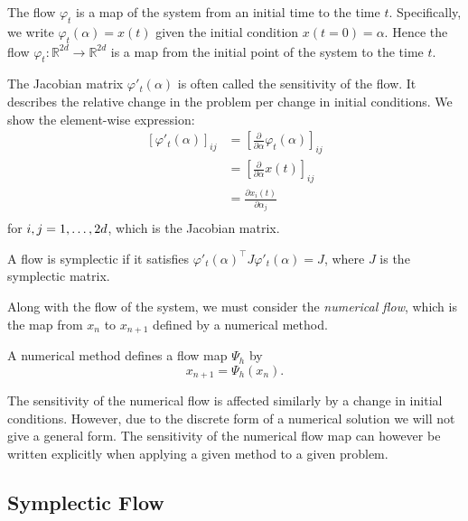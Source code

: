 \begin{definition}
	The flow $\varphi_t$ is a map of the system from an initial time to the time $t$.
	Specifically, we write $\varphi_t(\alpha) = {x}(t)$ given the initial condition ${x}(t=0) = \alpha$.
	Hence the flow $\varphi_t:\mathds{R}^{2d}\rightarrow \mathds{R}^{2d}$ is a map from the initial point of the system to the time $t$.
\end{definition}
The Jacobian matrix $\varphi'_t({\alpha})$ is often called the sensitivity of the flow.
It describes the relative change in the problem per change in initial conditions.
We show the element-wise expression: %
\begin{align*}
	\left[ \varphi'_t(\alpha) \right]_{ij} &= \left[ \frac{\partial }{\partial \alpha} \varphi_t(\alpha) \right]_{ij} \\
	&= \left[ \frac{\partial }{\partial \alpha} x(t) \right]_{ij} \\
	&= \frac{\partial x_i(t)}{\partial \alpha_j} \\
\end{align*}
for $i, j = 1, \mathellipsis, 2d$, which is the Jacobian matrix.
\begin{definition}
	A flow is symplectic if it satisfies $\varphi'_t(\alpha)^\top {J} \varphi'_t(\alpha) = {J}$,
	where $J$ is the symplectic matrix.
\end{definition}
Along with the flow of the system, we must consider the \textit{numerical flow},
which is the map from $x_n$ to $x_{n+1}$ defined by a numerical method.
\begin{definition}
	A numerical method defines a flow map $\Psi_h$ by
	\begin{equation*}
		x_{n+1} = \Psi_h(x_n).
	\end{equation*}
\end{definition}
The sensitivity of the numerical flow is affected similarly by a change in initial conditions. %
However, due to the discrete form of a numerical solution we will not give a general form.
The sensitivity of the numerical flow map can however be written explicitly when applying a given method to a given problem.

\subsection{Symplectic Flow}

